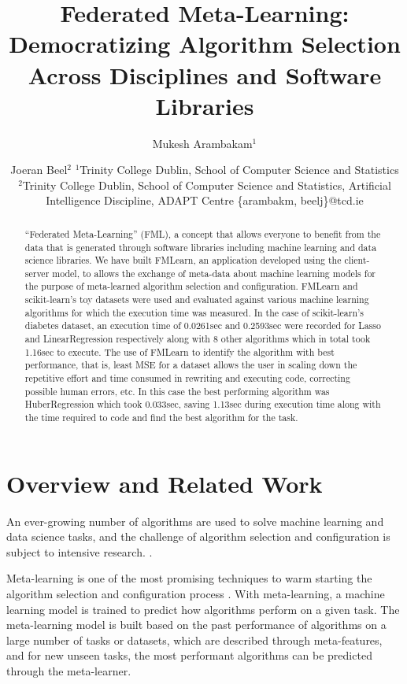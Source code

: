 \documentclass{article}
\title{Federated Meta-Learning: Democratizing Algorithm Selection Across Disciplines and Software Libraries}
\author{
Mukesh Arambakam$^1$
\and
Joeran Beel$^2$
\affiliations
$^1$Trinity College Dublin,
School of Computer Science and Statistics\\
$^2$Trinity College Dublin,
School of Computer Science and Statistics,
Artificial Intelligence Discipline,
ADAPT Centre
\emails
\{arambakm, beelj\}@tcd.ie
}
\begin{document}
\maketitle

\begin{abstract}
“Federated Meta-Learning” (FML), a concept that allows everyone to benefit from the data that is generated through software libraries including machine learning and data science libraries. We have built FMLearn, an application developed using the client-server model, to allows the exchange of meta-data about machine learning models for the purpose of meta-learned algorithm selection and configuration. FMLearn and scikit-learn’s toy datasets were used and evaluated against various machine learning algorithms for which the execution time was measured. In the case of scikit-learn’s diabetes dataset, an execution time of 0.0261sec and 0.2593sec were recorded for Lasso and LinearRegression respectively along with 8 other algorithms which in total took 1.16sec to execute. 
The use of FMLearn to identify the algorithm with best performance, that is, least MSE for a dataset allows the user in scaling down the repetitive effort and time consumed in rewriting and executing code, correcting possible human errors, etc. In this case the best performing algorithm was HuberRegression which took 0.033sec, saving 1.13sec during execution time along with the time required to code and find the best algorithm for the task.
\end{abstract}

\section{Overview and Related Work}
An ever-growing number of algorithms are used to solve machine learning and data science tasks, and the challenge of algorithm selection and configuration is subject to intensive research. \cite{bischl-et-al,brazdil:p,calandra-et-al,collins-et-al2018,cunha-et-al2017,edenhofer-et-al,ferrari-et-al,hutter-et-al,kotthoff:l,lindauer-et-al,romero-et-al,tu:w,vartak-et-al}.

Meta-learning is one of the most promising techniques to warm starting the algorithm selection and configuration process \cite{hutter-et-al}. With meta-learning, a machine learning model is trained to predict how algorithms perform on a given task. The meta-learning model is built based on the past performance of algorithms on a large number of tasks or datasets, which are described through meta-features, and for new unseen tasks, the most performant algorithms can be predicted through the meta-learner.
\end{document}
